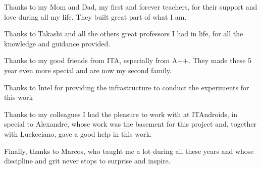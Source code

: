 
Thanks to my Mom and Dad, my first and forever teachers, for their support and love during all my life. They built great part of what I am.

Thanks to Takashi and all the others great professors I had in life, for all the knowledge and guidance provided.

Thanks to my good friends from ITA, especially from A++. They made these 5 year even more special and are now my second family.

Thanks to Intel for providing the infrastructure to conduct the experiments for this work

Thanks to my colleagues I had the pleasure to work with at ITAndroids, in special to Alexandre, whose work was the basement for this project and, together with Luckeciano, gave a good help in this work.

Finally, thanks to Marcos, who taught me a lot during all these years and whose discipline and grit never stops to surprise and inspire.